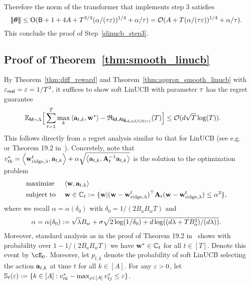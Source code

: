  Therefore the norm of the transformer that implements step 3 satisfies $$
 {\left|\!\left|\!\left|{{\boldsymbol \theta}}\right|\!\right|\!\right|}\leq {\mathrm{O}}({\mathsf{B}}+1+4A+T^{3/4}({\alpha/({\tau}\varepsilon)})^{1/4}+{\alpha}/{\tau})=
 \mathcal{O}(A+T({\alpha/({\tau}\varepsilon)})^{1/4}+\alpha/{\tau}).$$  This conclude the proof of Step~\ref{slinucb_step3}.
























\subsection{Proof of Theorem~\ref{thm:smooth_linucb}}\label{sec:pf_thm:smooth_linucb}

By Theorem~\ref{thm:diff_reward} and Theorem~\ref{thm:approx_smooth_linucb} with ${{\varepsilon}_{\sf real}=\varepsilon=1/{T}^3}$, it suffices to show soft LinUCB with parameter ${\tau}$ has the regret guarantee \begin{align*}
\mathbb{E}_{{\mathsf{M}}\sim{\Lambda}}\Big[\sum_{t=1}^{T}\max_{k}\left\langle{\mathbf a}_{t,k},{\mathbf w}^*\right\rangle-{\mathfrak{R}}_{{\mathsf{M}},{\mathsf{Alg}}_{{\mathrm{sLinUCB}}({\tau})}}({T})\Big]&\leq\mathcal{O}(d\sqrt{T}\log(T)).
\end{align*}
This follows directly from a  regret analysis similar to  that for LinUCB (see e.g.~\cite{chu2011contextual} or  Theorem 19.2 in~\cite{lattimore2020bandit}). Concretely, note that $v_{tk}^*=\left\langle{\mathbf w}^t_{{\rm ridge},\lambda},{\mathbf a}_{t,k}\right\rangle+\alpha\sqrt{\left\langle{\mathbf a}_{t,k}, {{\mathbf A}_t^{-1} {\mathbf a}_{t,k}}\right\rangle}$ is the solution to the optimization problem
\begin{align*}&\text{maximize }~~~\left\langle{\mathbf w},{\mathbf a}_{t,k}\right\rangle
\\
&\text{subject to }~~~{\mathbf w}\in {\mathbb{C}}_t:=\{{\mathbf w}|({\mathbf w}-{\mathbf w}^t_{{\rm ridge},\lambda})^\top{\mathbf A}_t({\mathbf w}-{\mathbf w}^t_{{\rm ridge},\lambda})\leq\alpha^2\},
\end{align*}
where we recall $\alpha=\alpha(\delta_0)$ with $\delta_0=1/(2B_aB_wT)$ and
\begin{align}
{\alpha}={\alpha}(\delta_0):=\sqrt{\lambda}B_w+\sigma\sqrt{2\log(1/\delta_0)+d\log((d\lambda+TB_a^2)/(d\lambda))}.\label{eq:recall_alpha_formula}
\end{align}
Moreover, standard analysis as in the proof of Theorem 19.2 in~\cite{lattimore2020bandit} shows with probability over $1-1/(2B_aB_wT)$ we have ${\mathbf w}^*\in{\mathbb{C}}_t$ for all $t\in[T]$. Denote this event by $\cE_0$. Moreover, let $p_{t,k}$ denote the probability of soft LinUCB selecting the action ${\mathbf a}_{t,k}$ at time $t$ for all $k\in[A]$.  For any $\varepsilon>0$, let ${\mathbb{S}}_t(\varepsilon):=\{k\in[A]:v^*_{tk}-\max_{j\in[A]}v^*_{tj}\leq \varepsilon\}$.

